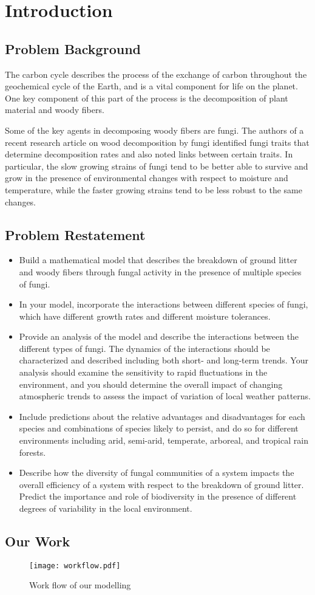\section{Introduction}\label{sec:intro}

\subsection{Problem Background}

The carbon cycle describes the process of the exchange of carbon throughout the geochemical cycle of the Earth, and is a vital component for life on the planet. One key component of this part of the process is the decomposition of plant material and woody fibers.

Some of the key agents in decomposing woody fibers are fungi. The authors of a recent research article on wood decomposition by fungi identified fungi traits that determine decomposition rates and also noted links between certain traits. In particular, the slow growing strains of fungi tend to be better able to survive and grow in the presence of environmental changes with respect to moisture and temperature, while the faster growing strains tend to be less robust to the same changes.

\subsection{Problem Restatement}
\begin{itemize}
\item Build a mathematical model that describes the breakdown of ground litter and woody fibers through fungal activity in the presence of multiple species of fungi.
\item In your model, incorporate the interactions between different species of fungi, which have different growth rates and different moisture tolerances.
\item Provide an analysis of the model and describe the interactions between the different types of fungi. The dynamics of the interactions should be characterized and described including both short- and long-term trends. Your analysis should examine the sensitivity to rapid fluctuations in the environment, and you should determine the overall impact of changing atmospheric trends to assess the impact of variation of local weather patterns.
\item Include predictions about the relative advantages and disadvantages for each species and combinations of species likely to persist, and do so for different environments including arid, semi-arid, temperate, arboreal, and tropical rain forests.
\item Describe how the diversity of fungal communities of a system impacts the overall efficiency of a system with respect to the breakdown of ground litter. Predict the importance and role of biodiversity in the presence of different degrees of variability in the local environment.
\end{itemize}
\subsection{Our Work}

\begin{figure}\caption{Work flow of our modelling}
    \begin{center}
        \texttt{[image: workflow.pdf]}
    \end{center}\end{figure}
